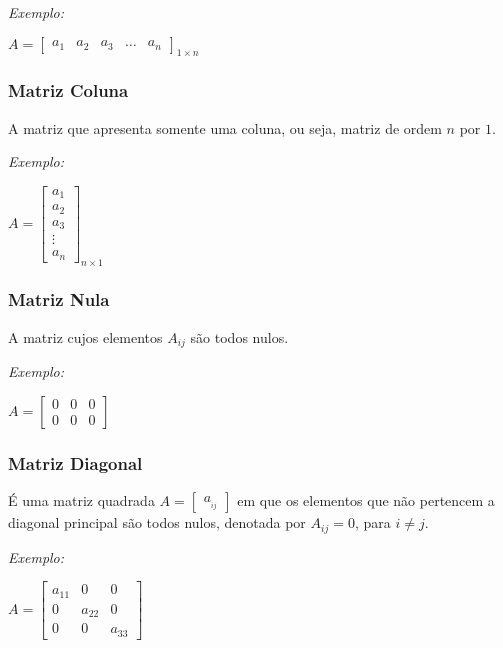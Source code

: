 \textit{Exemplo:}
\begin{center}
    $A = 
    \begin{bmatrix}
        a_{1} & a_{2} & a_{3} & \ldots & a_{n}
    \end{bmatrix}_{1 \times n}$
\end{center}

\subsubsection{Matriz Coluna}
\noindent A matriz que apresenta somente uma coluna, ou seja, matriz de ordem $n$ por $1$.

\textit{Exemplo:}
\begin{center}
    $A = 
    \begin{bmatrix}
        a_{1} \\ 
        a_{2} \\
        a_{3} \\
        \vdots \\
        a_{n} 
    \end{bmatrix}_{n \times 1}$
\end{center}

\subsubsection{Matriz Nula}
\noindent A matriz cujos elementos $A{}_{ij}$ são todos nulos.

\textit{Exemplo:}
\begin{center}
    $A = 
    \begin{bmatrix}
        0 & 0 & 0\\ 
        0 & 0 & 0 
    \end{bmatrix}$
\end{center}

\subsubsection{Matriz Diagonal}
\noindent É uma matriz quadrada $A = \begin{bmatrix} a_{}_{ij} \end{bmatrix}$ em que os elementos que não pertencem a diagonal principal são todos nulos, denotada por $A{}_{ij} = 0$, para $i \neq j$.

\textit{Exemplo:}
\begin{center}
    $A = 
    \begin{bmatrix}
        a_{11} & 0 & 0 \\ 
        0 & a_{22} & 0 \\ 
        0 & 0 & a_{33}  
    \end{bmatrix}$
\end{center}


